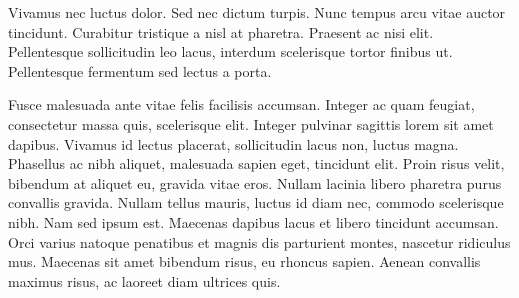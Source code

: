 Vivamus nec luctus dolor.
Sed nec dictum turpis.
Nunc tempus arcu vitae auctor tincidunt.
Curabitur tristique a nisl at pharetra.
Praesent ac nisi elit.
Pellentesque sollicitudin leo lacus, interdum scelerisque tortor finibus ut.
Pellentesque fermentum sed lectus a porta.

Fusce malesuada ante vitae felis facilisis accumsan.
Integer ac quam feugiat, consectetur massa quis, scelerisque elit.
Integer pulvinar sagittis lorem sit amet dapibus.
Vivamus id lectus placerat, sollicitudin lacus non, luctus magna.
Phasellus ac nibh aliquet, malesuada sapien eget, tincidunt elit.
Proin risus velit, bibendum at aliquet eu, gravida vitae eros.
Nullam lacinia libero pharetra purus convallis gravida.
Nullam tellus mauris, luctus id diam nec, commodo scelerisque nibh.
Nam sed ipsum est.
Maecenas dapibus lacus et libero tincidunt accumsan.
Orci varius natoque penatibus et magnis dis parturient montes, nascetur ridiculus mus.
Maecenas sit amet bibendum risus, eu rhoncus sapien.
Aenean convallis maximus risus, ac laoreet diam ultrices quis.

\bye

